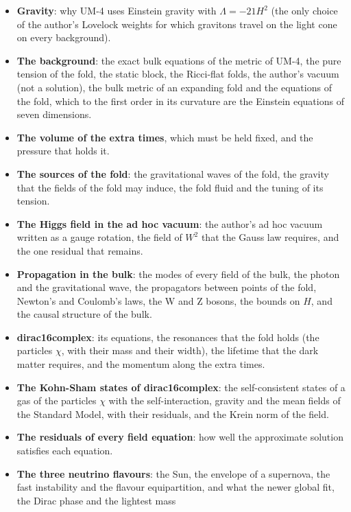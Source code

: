 \documentclass[
  10pt,
]{article}
\providecommand{\tightlist}{%
  \setlength{\itemsep}{0pt}\setlength{\parskip}{0pt}}
\begin{document}
\begin{itemize}
\tightlist
\item
  \textbf{Gravity}: why UM-4 uses Einstein gravity with
  \(\Lambda = -21H^2\) (the only choice of the author's Lovelock weights
  for which gravitons travel on the light cone on every background).
\item
  \textbf{The background}: the exact bulk equations of the metric of
  UM-4, the pure tension of the fold, the static block, the Ricci-flat
  folds, the author's vacuum (not a solution), the bulk metric of an
  expanding fold and the equations of the fold, which to the first order
  in its curvature are the Einstein equations of seven dimensions.
\item
  \textbf{The volume of the extra times}, which must be held fixed, and
  the pressure that holds it.
\item
  \textbf{The sources of the fold}: the gravitational waves of the fold,
  the gravity that the fields of the fold may induce, the fold fluid and
  the tuning of its tension.
\item
  \textbf{The Higgs field in the ad hoc vacuum}: the author's ad hoc
  vacuum written as a gauge rotation, the field of \(W^2\) that the
  Gauss law requires, and the one residual that remains.
\item
  \textbf{Propagation in the bulk}: the modes of every field of the
  bulk, the photon and the gravitational wave, the propagators between
  points of the fold, Newton's and Coulomb's laws, the W and Z bosons,
  the bounds on \(H\), and the causal structure of the bulk.
\item
  \textbf{dirac16complex}: its equations, the resonances that the fold
  holds (the particles \(\chi\), with their mass and their width), the
  lifetime that the dark matter requires, and the momentum along the
  extra times.
\item
  \textbf{The Kohn-Sham states of dirac16complex}: the self-consistent
  states of a gas of the particles \(\chi\) with the self-interaction,
  gravity and the mean fields of the Standard Model, with their
  residuals, and the Krein norm of the field.
\item
  \textbf{The residuals of every field equation}: how well the
  approximate solution satisfies each equation.
\item
  \textbf{The three neutrino flavours}: the Sun, the envelope of a
  supernova, the fast instability and the flavour equipartition, and
  what the newer global fit, the Dirac phase and the lightest mass

\end{itemize}
\end{document}
